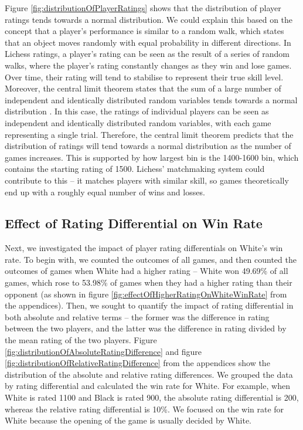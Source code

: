 \documentclass[a4paper, 11pt]{article}
\begin{document}
Figure \ref{fig:distributionOfPlayerRatings} shows that the distribution of player ratings tends towards a normal distribution. We could explain this based on the concept that a player's performance is similar to a random walk, which states that an object moves randomly with equal probability in different directions. In Lichess ratings, a player's rating can be seen as the result of a series of random walks, where the player's rating constantly changes as they win and lose games. Over time, their rating will tend to stabilise to represent their true skill level. Moreover, the central limit theorem states that the sum of a large number of independent and identically distributed random variables tends towards a normal distribution \cite{le1986central}. In this case, the ratings of individual players can be seen as independent and identically distributed random variables, with each game representing a single trial. Therefore, the central limit theorem predicts that the distribution of ratings will tend towards a normal distribution as the number of games increases. This is supported by how largest bin is the 1400-1600 bin, which contains the starting rating of 1500. Lichess' matchmaking system could contribute to this -- it matches players with similar skill, so games theoretically end up with a roughly equal number of wins and losses.

\subsection{Effect of Rating Differential on Win Rate}
Next, we investigated the impact of player rating differentials on White's win rate. To begin with, we counted the outcomes of all games, and then counted the outcomes of games when White had a higher rating -- White won 49.69\% of all games, which rose to 53.98\% of games when they had a higher rating than their opponent (as shown in figure \ref{fig:effectOfHigherRatingOnWhiteWinRate} from the appendices). Then, we sought to quantify the impact of rating differential in both absolute and relative terms -- the former was the difference in rating between the two players, and the latter was the difference in rating divided by the mean rating of the two players. Figure \ref{fig:distributionOfAbsoluteRatingDifference} and figure \ref{fig:distributionOfRelativeRatingDifference} from the appendices show the distribution of the absolute and relative rating differences. We grouped the data by rating differential and calculated the win rate for White. For example, when White is rated 1100 and Black is rated 900, the absolute rating differential is 200, whereas the relative rating differential is 10\%. We focused on the win rate for White because the opening of the game is usually decided by White.
\end{document}
